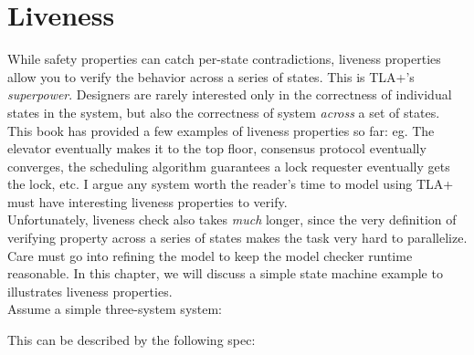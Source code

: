 % 

\chapter{Liveness}
\label{chap:liveness}

While safety properties can catch per-state contradictions, liveness properties
allow you to verify the behavior across a series of states. This is TLA+'s
\textit{superpower}. Designers are rarely interested only in the correctness of
individual states in the system, but also the correctness of system 
\textit{across} a set of states.\\

This book has provided a few examples of liveness properties so far: eg.  The
elevator eventually makes it to the top floor, consensus protocol eventually
converges, the scheduling algorithm guarantees a lock requester eventually gets
the lock, etc. I argue any system worth the reader's time to model using TLA+
must have interesting liveness properties to verify.\\

Unfortunately, liveness check also takes \textit{much} longer, since the very
definition of verifying property across a series of states makes the task very
hard to parallelize. Care must go into refining the model to keep the model
checker runtime reasonable. In this chapter, we will discuss a simple state
machine example to illustrates liveness properties. \\

Assume a simple three-system system:\\

\begin{center}
\end{center}

This can be described by the following spec:\newline

